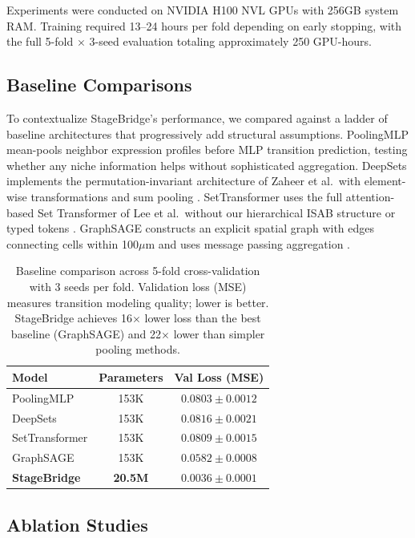 \documentclass[conference]{IEEEtran}
\begin{document}
Experiments were conducted on NVIDIA H100 NVL GPUs with 256GB system RAM. Training required 13--24 hours per fold depending on early stopping, with the full 5-fold $\times$ 3-seed evaluation totaling approximately 250 GPU-hours.

\subsection{Baseline Comparisons}

To contextualize StageBridge's performance, we compared against a ladder of baseline architectures that progressively add structural assumptions. PoolingMLP mean-pools neighbor expression profiles before MLP transition prediction, testing whether any niche information helps without sophisticated aggregation. DeepSets implements the permutation-invariant architecture of Zaheer et al.\ with element-wise transformations and sum pooling \cite{Zaheer2017-gu}. SetTransformer uses the full attention-based Set Transformer of Lee et al.\ without our hierarchical ISAB structure or typed tokens \cite{Lee2018-ya}. GraphSAGE constructs an explicit spatial graph with edges connecting cells within 100$\mu$m and uses message passing aggregation \cite{Hamilton2017-ne}.

\begin{table}[h]
\caption{Baseline comparison across 5-fold cross-validation with 3 seeds per fold. Validation loss (MSE) measures transition modeling quality; lower is better. StageBridge achieves 16$\times$ lower loss than the best baseline (GraphSAGE) and 22$\times$ lower than simpler pooling methods.}
\label{tab:baselines}
\centering
\begin{tabular}{lcc}
\toprule
Model & Parameters & Val Loss (MSE) \\
\midrule
PoolingMLP & 153K & $0.0803 \pm 0.0012$ \\
DeepSets & 153K & $0.0816 \pm 0.0021$ \\
SetTransformer & 153K & $0.0809 \pm 0.0015$ \\
GraphSAGE & 153K & $0.0582 \pm 0.0008$ \\
\textbf{StageBridge} & \textbf{20.5M} & $\mathbf{0.0036 \pm 0.0001}$ \\
\bottomrule
\end{tabular}
\end{table}

\subsection{Ablation Studies}
\end{document}
